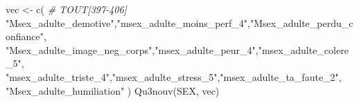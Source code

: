 \documentclass[
]{article}
\newenvironment{Shaded}{\begin{snugshade}}{\end{snugshade}}
\newcommand{\CommentTok}[1]{\textcolor[rgb]{0.56,0.35,0.01}{\textit{#1}}}
\newcommand{\FunctionTok}[1]{\textcolor[rgb]{0.00,0.00,0.00}{#1}}
\newcommand{\NormalTok}[1]{#1}
\newcommand{\OtherTok}[1]{\textcolor[rgb]{0.56,0.35,0.01}{#1}}
\newcommand{\StringTok}[1]{\textcolor[rgb]{0.31,0.60,0.02}{#1}}
\begin{document}
\begin{Shaded}
\begin{Highlighting}[]
\NormalTok{vec }\OtherTok{\textless{}{-}} \FunctionTok{c}\NormalTok{(  }\CommentTok{\# TOUT[397{-}406]}
  \StringTok{"Msex\_adulte\_demotive"}\NormalTok{,}\StringTok{"msex\_adulte\_moins\_perf\_4"}\NormalTok{,}\StringTok{"Msex\_adulte\_perdu\_confiance"}\NormalTok{,}
  \StringTok{"Msex\_adulte\_image\_neg\_corps"}\NormalTok{,}\StringTok{"msex\_adulte\_peur\_4"}\NormalTok{,}\StringTok{"msex\_adulte\_colere\_5"}\NormalTok{,}
  \StringTok{"msex\_adulte\_triste\_4"}\NormalTok{,}\StringTok{"msex\_adulte\_stress\_5"}\NormalTok{,}\StringTok{"msex\_adulte\_ta\_faute\_2"}\NormalTok{,}
  \StringTok{"Msex\_adulte\_humiliation"}
\NormalTok{  )}
\FunctionTok{Qu3nouv}\NormalTok{(SEX, vec)}
\end{Highlighting}
\end{Shaded}
\end{document}
